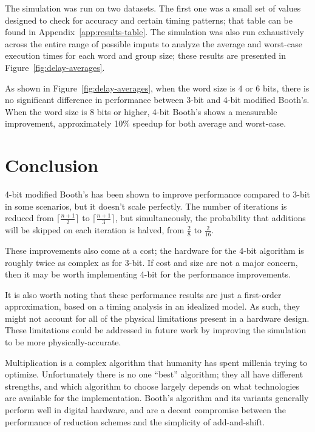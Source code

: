 \documentclass[12pt]{article}
\begin{document}
The simulation was run on two datasets. The first one was a small set of values
designed to check for accuracy and certain timing patterns; that table can be
found in Appendix~\ref{app:results-table}. The simulation was also run
exhaustively across the entire range of possible imputs to analyze the average
and worst-case execution times for each word and group size; these results are
presented in Figure~\ref{fig:delay-averages}.

As shown in Figure~\ref{fig:delay-averages}, when the word size is 4 or 6 bits,
there is no significant difference in performance between 3-bit and 4-bit
modified Booth's. When the word size is 8 bits or higher, 4-bit Booth's shows a
measurable improvement, approximately 10\% speedup for both average and
worst-case.

\section{Conclusion}

4-bit modified Booth's has been shown to improve performance compared to 3-bit
in some scenarios, but it doesn't scale perfectly. The number of iterations is
reduced from $\lceil\frac{n + 1}{2}\rceil$ to $\lceil\frac{n + 1}{3}\rceil$,
but simultaneously, the probability that additions will be skipped on each
iteration is halved, from $\frac{2}{8}$ to $\frac{2}{16}$.

These improvements also come at a cost; the hardware for the 4-bit algorithm is
roughly twice as complex as for 3-bit. If cost and size are not a major
concern, then it may be worth implementing 4-bit for the performance
improvements.

It is also worth noting that these performance results are just a first-order
approximation, based on a timing analysis in an idealized model. As such, they
might not account for all of the physical limitations present in a hardware 
design. These limitations could be addressed in future work by improving the
simulation to be more physically-accurate.

Multiplication is a complex algorithm that humanity has spent millenia trying
to optimize. Unfortunately there is no one ``best'' algorithm; they all have
different strengths, and which algorithm to choose largely depends on what
technologies are available for the implementation. Booth's algorithm and its
variants generally perform well in digital hardware, and are a decent
compromise between the performance of reduction schemes and the simplicity of
add-and-shift.
\end{document}
